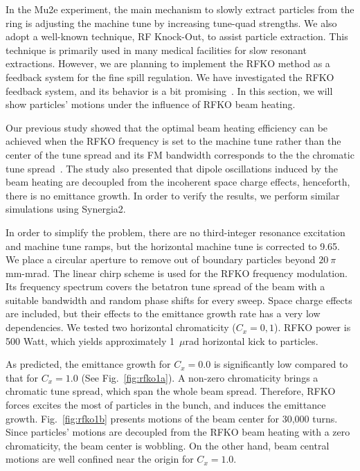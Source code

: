 \documentclass[aps,prstab,onecolumn,preprint]{revtex4-1}
\begin{document}
In the Mu2e experiment, the main mechanism to slowly extract particles from the ring is adjusting the machine tune by increasing tune-quad strengths. We also adopt a well-known technique, RF Knock-Out, to assist particle extraction. This technique is primarily used in many medical facilities for slow resonant extractions. However, we are planning to implement the RFKO method as a feedback system for the fine spill regulation. We have investigated the RFKO feedback system, and its behavior is a bit promising~\cite{mu2e}. In this section, we will show particles' motions under the influence of RFKO beam heating. 

Our previous study showed that the optimal beam heating efficiency can be achieved when the RFKO frequency is set to the machine tune rather than the center of the tune spread and its FM bandwidth corresponds to the the chromatic tune spread~\cite{ipac11}. The study also presented that dipole oscillations induced by the beam heating are decoupled from the incoherent space charge effects, henceforth, there is no emittance growth. In order to verify the results, we perform similar simulations using Synergia2.

In order to simplify the problem, there are no third-integer resonance excitation and machine tune ramps, but the horizontal machine tune is corrected to 9.65. We place a circular aperture to remove out of boundary particles beyond $20~\pi$mm-mrad. The linear chirp scheme is used for the RFKO frequency modulation. Its frequency spectrum covers the betatron tune spread of the beam with a suitable bandwidth and random phase shifts for every sweep. Space charge effects are included, but their effects to the emittance growth rate has a very low dependencies. We tested two horizontal chromaticity ($C_{x} = 0,1$). RFKO power is 500 Watt, which yields approximately 1~$\mu$rad horizontal kick to particles. 

As predicted, the emittance growth for $C_{x}=0.0$ is significantly low compared to that for $C_{x}=1.0$ (See Fig.~\ref{fig:rfko1a}). A non-zero chromaticity brings a chromatic tune spread, which span the whole beam spread. Therefore, RFKO forces excites the most of particles in the bunch, and induces the emittance growth. Fig.~\ref{fig:rfko1b} presents motions of the beam center for 30,000 turns. Since particles' motions are decoupled from the RFKO beam heating with a zero chromaticity, the beam center is wobbling. On the other hand, beam central motions are well confined near the origin for $C_{x}=1.0$.
\end{document}
